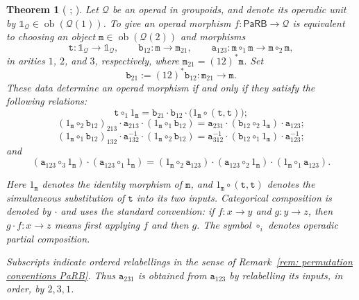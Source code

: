 \documentclass{amsart}
\newcommand{\calQ}{\mathcal{Q}}
\newcommand{\PaRB}{\mathsf{PaRB}}
\newcommand{\ob}{\operatorname{ob}}
\newtheorem{thm}[theorem]{Theorem}%
\theoremstyle{definition}
\numberwithin{equation}{section}
\begin{document}
\begin{thm}[
\textnormal{\cite[Lemmas~7.1 and~7.4]{Boavida-Horel-Robertson}};
\textnormal{\cite[Theorem~6.2.4]{FresseBook1}}]
\label{thm: maps out of PaRB}
Let $\calQ$ be an operad in groupoids, and denote its operadic unit by $\mathbb{1}_{\calQ}\in\ob(\calQ(1))$. To give an operad morphism $f\colon\PaRB\to\calQ$ is equivalent to choosing an object $\mathtt m\in\ob(\calQ(2))$ and morphisms
\[
\mathtt t\colon
\mathbb{1}_{\calQ}\longrightarrow\mathbb{1}_{\calQ},
\qquad
\mathtt b_{12}\colon
\mathtt m\longrightarrow\mathtt m_{21},
\qquad
\mathtt a_{123}\colon
\mathtt m\circ_1\mathtt m
\longrightarrow
\mathtt m\circ_2\mathtt m,
\]
in arities $1$, $2$, and $3$, respectively, where
$\mathtt m_{21}=(12)^*\mathtt m$. Set
\[
\mathtt b_{21}:=(12)^*\mathtt b_{12}\colon
\mathtt m_{21}\longrightarrow\mathtt m.
\]
These data determine an operad morphism if and only if they satisfy the following relations:
\begin{equation}
\label{twist_rel_morph}\tag{T}
\mathtt t\circ_1 1_{\mathtt m}
=
\mathtt b_{21}\cdot\mathtt b_{12}\cdot
\bigl(1_{\mathtt m}\circ(\mathtt t,\mathtt t)\bigr);
\end{equation}
\begin{equation}
\label{hex_rel_1_morph}\tag{H1}
(1_{\mathtt m}\circ_2\mathtt b_{12})_{213}
\cdot\mathtt a_{213}
\cdot(1_{\mathtt m}\circ_1\mathtt b_{12})
=
\mathtt a_{231}
\cdot(\mathtt b_{12}\circ_2 1_{\mathtt m})
\cdot\mathtt a_{123};
\end{equation}
\begin{equation}
\label{hex_rel_2_morph}\tag{H2}
(1_{\mathtt m}\circ_1\mathtt b_{12})_{132}
\cdot\mathtt a_{132}^{-1}
\cdot(1_{\mathtt m}\circ_2\mathtt b_{12})
=
\mathtt a_{312}^{-1}
\cdot(\mathtt b_{12}\circ_1 1_{\mathtt m})
\cdot\mathtt a_{123}^{-1};
\end{equation}
and
\begin{equation}
\label{pent_rel_1_morph}\tag{P}
(\mathtt a_{123}\circ_3 1_{\mathtt m})
\cdot(\mathtt a_{123}\circ_1 1_{\mathtt m})
=
(1_{\mathtt m}\circ_2\mathtt a_{123})
\cdot(\mathtt a_{123}\circ_2 1_{\mathtt m})
\cdot(1_{\mathtt m}\circ_1\mathtt a_{123}).
\end{equation}

Here $1_{\mathtt m}$ denotes the identity morphism of $\mathtt m$, and $1_{\mathtt m}\circ(\mathtt t,\mathtt t)$ denotes the simultaneous substitution of $\mathtt t$ into its two inputs. Categorical composition is denoted by $\cdot$ and uses the standard convention: if $f\colon x\to y$ and $g\colon y\to z$, then $g\cdot f\colon x\to z$ means first applying $f$ and then $g$. The symbol $\circ_i$ denotes operadic partial composition.

Subscripts indicate ordered relabellings in the sense of Remark~\ref{rem: permutation conventions PaRB}. Thus $\mathtt a_{231}$ is obtained from $\mathtt a_{123}$ by relabelling its inputs, in order, by $2,3,1$.
\end{thm}
\end{document}
